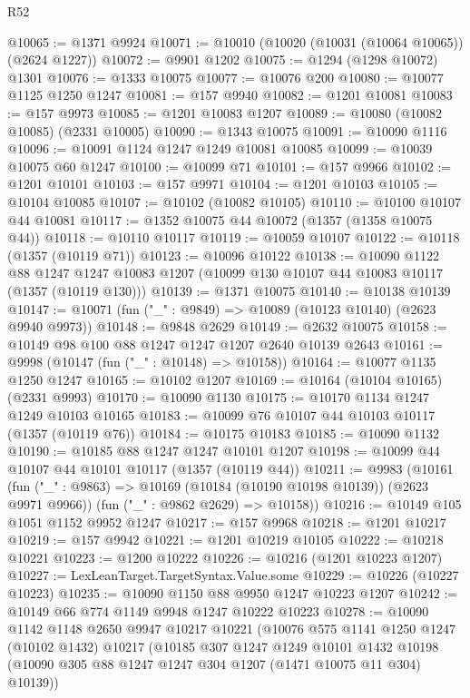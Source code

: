 \begin{lexlean}{R52}
\begin{coremodule}
@10065 := @1371 @9924
@10071 := @10010 (@10020 (@10031 (@10064 @10065)) (@2624 @1227))
@10072 := @9901 @1202
@10075 := @1294 (@1298 @10072) @1301
@10076 := @1333 @10075
@10077 := @10076 @200
@10080 := @10077 @1125 @1250 @1247
@10081 := @157 @9940
@10082 := @1201 @10081
@10083 := @157 @9973
@10085 := @1201 @10083 @1207
@10089 := @10080 (@10082 @10085) (@2331 @10005)
@10090 := @1343 @10075
@10091 := @10090 @1116
@10096 := @10091 @1124 @1247 @1249 @10081 @10085
@10099 := @10039 @10075 @60 @1247
@10100 := @10099 @71
@10101 := @157 @9966
@10102 := @1201 @10101
@10103 := @157 @9971
@10104 := @1201 @10103
@10105 := @10104 @10085
@10107 := @10102 (@10082 @10105)
@10110 := @10100 @10107 @44 @10081
@10117 := @1352 @10075 @44 @10072 (@1357 (@1358 @10075 @44))
@10118 := @10110 @10117
@10119 := @10059 @10107
@10122 := @10118 (@1357 (@10119 @71))
@10123 := @10096 @10122
@10138 := @10090
    @1122
    @88
    @1247
    @1247
    @10083
    @1207
    (@10099 @130 @10107 @44 @10083 @10117 (@1357 (@10119 @130)))
@10139 := @1371 @10075
@10140 := @10138 @10139
@10147 := @10071 (fun ("_" : @9849) => @10089 (@10123 @10140) (@2623 @9940 @9973))
@10148 := @9848 @2629
@10149 := @2632 @10075
@10158 := @10149 @98 @100 @88 @1247 @1247 @1207 @2640 @10139 @2643
@10161 := @9998 (@10147 (fun ("_" : @10148) => @10158))
@10164 := @10077 @1135 @1250 @1247
@10165 := @10102 @1207
@10169 := @10164 (@10104 @10165) (@2331 @9993)
@10170 := @10090 @1130
@10175 := @10170 @1134 @1247 @1249 @10103 @10165
@10183 := @10099 @76 @10107 @44 @10103 @10117 (@1357 (@10119 @76))
@10184 := @10175 @10183
@10185 := @10090 @1132
@10190 := @10185 @88 @1247 @1247 @10101 @1207
@10198 := @10099 @44 @10107 @44 @10101 @10117 (@1357 (@10119 @44))
@10211 := @9983
    (@10161
      (fun ("_" : @9863) => @10169 (@10184 (@10190 @10198 @10139)) (@2623 @9971 @9966))
      (fun ("_" : @9862 @2629) => @10158))
@10216 := @10149 @105 @1051 @1152 @9952 @1247
@10217 := @157 @9968
@10218 := @1201 @10217
@10219 := @157 @9942
@10221 := @1201 @10219 @10105
@10222 := @10218 @10221
@10223 := @1200 @10222
@10226 := @10216 (@1201 @10223 @1207)
@10227 := LexLeanTarget.TargetSyntax.Value.some
@10229 := @10226 (@10227 @10223)
@10235 := @10090 @1150 @88 @9950 @1247 @10223 @1207
@10242 := @10149 @66 @774 @1149 @9948 @1247 @10222 @10223
@10278 := @10090
    @1142
    @1148
    @2650
    @9947
    @10217
    @10221
    (@10076
      @575
      @1141
      @1250
      @1247
      (@10102 @1432)
      @10217
      (@10185
        @307
        @1247
        @1249
        @10101
        @1432
        @10198
        (@10090 @305 @88 @1247 @1247 @304 @1207 (@1471 @10075 @11 @304) @10139))

\end{coremodule}
\end{lexlean}
